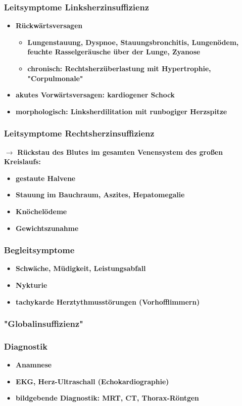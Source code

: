 		\subsubsection*{Leitsymptome Linksherzinsuffizienz}
			\begin{itemize}
				\item \textbf{Rückwärtsversagen}
					\begin{itemize}
						\item \textbf{Lungenstauung, Dyspnoe, Stauungsbronchitis, Lungenödem, feuchte Rasselgeräusche über der Lunge, Zyanose}
						\item \textbf{chronisch: Rechtsherzüberlastung mit Hypertrophie, "Corpulmonale"}
					\end{itemize}
				\item \textbf{akutes Vorwärtsversagen: kardiogener Schock}
				\item \textbf{morphologisch: Linksherdilitation mit runbogiger Herzspitze}
			\end{itemize}
		\subsubsection*{Leitsymptome Rechtsherzinsuffizienz}
			\textbf{$\rightarrow$ Rückstau des Blutes im gesamten Venensystem des großen Kreislaufs:}
			\begin{itemize}
				\item \textbf{gestaute Halvene}
				\item \textbf{Stauung im Bauchraum, Aszites, Hepatomegalie}
				\item \textbf{Knöchelödeme}
				\item \textbf{Gewichtszunahme}
			\end{itemize}
		\subsubsection*{Begleitsymptome}
			\begin{itemize}
				\item \textbf{Schwäche, Müdigkeit, Leistungsabfall}
				\item \textbf{Nykturie}
				\item \textbf{tachykarde Herztythmusstörungen (Vorhofflimmern)}
			\end{itemize}
		\subsubsection*{"Globalinsuffizienz"}
		\subsubsection*{Diagnostik}
			\begin{itemize}
				\item \textbf{Anamnese}
				\item \textbf{EKG, Herz-Ultraschall (Echokardiographie)}
				\item \textbf{bildgebende Diagnostik: MRT, CT, Thorax-Röntgen}
			\end{itemize}
